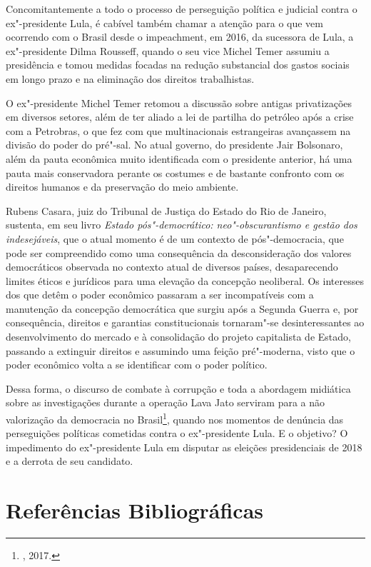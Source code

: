 Concomitantemente a todo o processo de perseguição política e judicial
contra o ex"-presidente Lula, é cabível também chamar a atenção para o
que vem ocorrendo com o Brasil desde o impeachment, em 2016, da
sucessora de Lula, a ex"-presidente Dilma Rousseff, quando o seu vice
Michel Temer assumiu a presidência e tomou medidas focadas na redução
substancial dos gastos sociais em longo prazo e na eliminação dos
direitos trabalhistas.

O ex"-presidente Michel Temer retomou a discussão sobre antigas
privatizações em diversos setores, além de ter aliado a lei de partilha
do petróleo após a crise com a Petrobras, o que fez com que
multinacionais estrangeiras avançassem na divisão do poder do pré"-sal.
No atual governo, do presidente Jair Bolsonaro, além da pauta econômica
muito identificada com o presidente anterior, há uma pauta mais
conservadora perante os costumes e de bastante confronto com os direitos
humanos e da preservação do meio ambiente.

Rubens Casara, juiz do Tribunal de Justiça do Estado do Rio de Janeiro,
sustenta, em seu livro \emph{Estado pós"-democrático: neo"-obscurantismo e
gestão dos indesejáveis}, que o atual momento é de um contexto de
pós"-democracia, que pode ser compreendido como uma consequência da
desconsideração dos valores democráticos observada no contexto atual de
diversos países, desaparecendo limites éticos e jurídicos para uma
elevação da concepção neoliberal. Os interesses dos que detêm o poder
econômico passaram a ser incompatíveis com a manutenção da concepção
democrática que surgiu após a Segunda Guerra e, por consequência,
direitos e garantias constitucionais tornaram"-se desinteressantes ao
desenvolvimento do mercado e à consolidação do projeto capitalista de
Estado, passando a extinguir direitos e assumindo uma feição
pré"-moderna, visto que o poder econômico volta a se identificar com o
poder político.

Dessa forma, o discurso de combate à corrupção e toda a abordagem
midiática sobre as investigações durante a operação Lava Jato serviram
para a não valorização da democracia no Brasil\footnote{,
2017.}, quando nos momentos de denúncia das perseguições políticas
cometidas contra o ex"-presidente Lula. E o objetivo? O impedimento do
ex"-presidente Lula em disputar as eleições presidenciais de 2018 e a
derrota de seu candidato.

\pagebreak

\section{Referências Bibliográficas}

